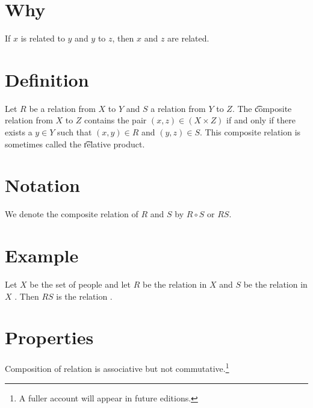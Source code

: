 

\section*{Why}

If $x$ is related to $y$ and $y$ to $z$, then $x$ and $z$ are related.

\section*{Definition}

Let $R$ be a relation from $X$ to $Y$ and $S$ a relation from $Y$ to $Z$.
The \t{composite relation} from $X$ to $Z$ contains the pair $(x, z) \in (X \times  Z)$ if and only if there exists a $y \in Y$ such that $(x, y) \in R$ and $(y,z) \in S$.
This composite relation is sometimes called the \t{relative product}.

\section*{Notation}

We denote the composite relation of $R$ and $S$ by $R \circ S$ or $RS$.

\section*{Example}

Let $X$ be the set of people and let $R$ be the relation in $X$  and $S$ be the relation in $X$ .
Then $RS$ is the relation .

\section*{Properties}

Composition of relation is associative but not commutative.\footnote{A fuller account will appear in future editions.}


\blankpage